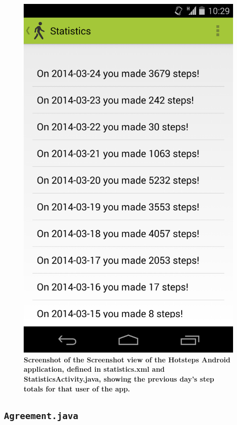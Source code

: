 \documentclass{l4proj}
\begin{document}
\begin{figure}[ht!]
\centering
\includegraphics[scale=0.2]{images/screenshots/statisticsscreen.png}
\caption{\textbf{Screenshot of the Screenshot view of the Hotsteps Android application, defined in statistics.xml and StatisticsActivity.java, showing the previous day's step totals for that user of the app.}}
\label{impl:dia23}
\end{figure}

\subsection{\texttt{Agreement.java}}
 
\end{document}
